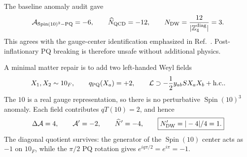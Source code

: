 \documentclass[11pt]{article}
\newcommand{\Spin}{\operatorname{Spin}}
\newcommand{\hc}{\mathrm{h.c.}}
\begin{document}
The baseline anomaly audit gave
\begin{equation}
 \mathcal A_{\Spin(10)^2-\mathrm{PQ}}=-6,\qquad
 \widehat N_{\rm QCD}=-12,\qquad
 N_{\rm DW}=\frac{12}{|\mathbb Z_4^{\rm diag}|}=3.
 \label{eq:baselineDW}
\end{equation}
This agrees with the gauge-center identification emphasized in
Ref.~\cite{Ernst2018}.  Post-inflationary PQ breaking is therefore unsafe
without additional physics.

A minimal matter repair is to add two left-handed Weyl fields
\begin{equation}
 X_1,X_2\sim10_F,\qquad q_{\rm PQ}(X_a)=+2,\qquad
 \mathcal L\supset-\frac12y_{ab}S X_aX_b+\hc.
 \label{eq:F10}
\end{equation}
The $10$ is a real gauge representation, so there is no perturbative
$\Spin(10)^3$ anomaly.  Each field contributes $qT(10)=2$, and hence
\begin{equation}
 \Delta\mathcal A=4,\qquad
 \mathcal A'=-2,\qquad \widehat N'=-4,\qquad
 \boxed{N'_{\rm DW}=|-4|/4=1.}
 \label{eq:NDW1}
\end{equation}
The diagonal quotient survives: the generator of the $\Spin(10)$ center acts
as $-1$ on $10_F$, while the $\pi/2$ PQ rotation gives
$e^{iq\pi/2}=e^{i\pi}=-1$.
\end{document}

